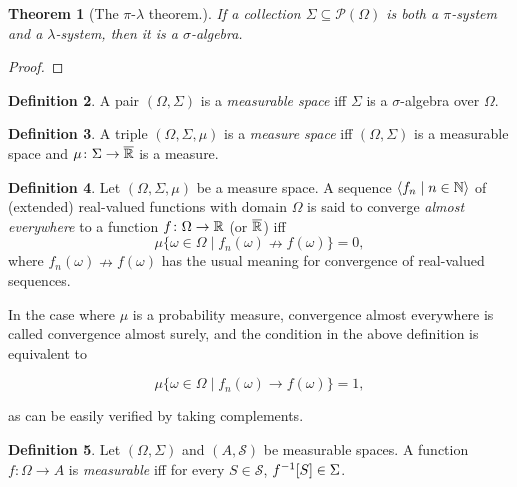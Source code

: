 \documentclass{amsart}
\newtheorem{theorem}{Theorem}[section]
\theoremstyle{definition}
\newtheorem{definition}[theorem]{Definition}
\theoremstyle{remark}
\newcommand{\bldset}[2]{\{{#1}\mid{#2}\}}
\newcommand{\bldseq}[2]{\langle{#1}\mid{#2}\rangle}
\begin{document}
\begin{theorem}[The $\pi$-$\lambda$ theorem.]
If a collection $\Sigma \subseteq \mathcal P (\Omega)$ is both a $\pi$-system and a $\lambda$-system, then it is a $\sigma$-algebra.
\end{theorem}

\begin{proof}
\end{proof}


\begin{definition}
A pair $(\Omega, \Sigma)$ is a {\em measurable space} iff $\Sigma$ is a $\sigma$-algebra over $\Omega$.
\end{definition}

\begin{definition}
A triple $(\Omega, \Sigma, \mu)$ is a {\em measure space} iff $(\Omega, \Sigma)$ is a measurable space and $\mu\colon \Sigma \rightarrow \overline {\mathbb{R}}$ is a measure.
\end{definition}


\begin{definition}
Let $(\Omega, \Sigma, \mu)$ be a measure space. A sequence $\bldseq{f_n}{n \in \N}$ of (extended) real-valued functions with domain $\Omega$ is said to converge {\em almost everywhere} to a function $f\colon \Omega \rightarrow \mathbb{R}$ (or $\overline {\mathbb{R}}$) iff
\[ \mu \bldset{\omega \in \Omega}{f_n(\omega) \nrightarrow f(\omega)} = 0, \]
where $f_n(\omega) \nrightarrow f(\omega)$ has the usual meaning for convergence of real-valued sequences.
\end{definition}

In the case where $\mu$ is a probability measure, convergence almost everywhere is called convergence almost surely, and the condition in the above definition is equivalent to

\[ \mu \bldset{\omega \in \Omega}{f_n(\omega) \rightarrow f(\omega)} = 1, \]

as can be easily verified by taking complements.


\begin{definition}
Let $(\Omega, \Sigma)$ and $(A, \mathcal S)$ be measurable spaces. A function $f\colon \Omega \rightarrow A$ is {\em measurable} iff for every $S \in \mathcal S$, $f^{-1}[S] \in \Sigma$.
\end{definition}
\end{document}
